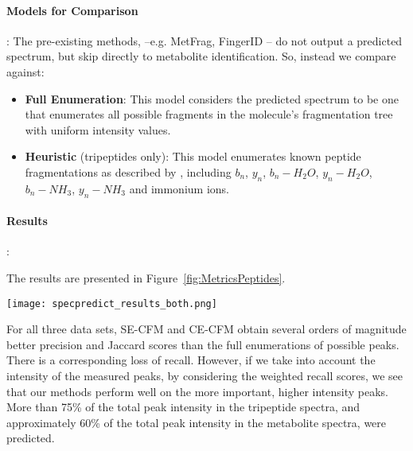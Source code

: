 \paragraph{Models for Comparison}:
The pre-existing methods, --e.g. MetFrag, FingerID -- do not output a predicted spectrum, but skip directly to metabolite identification. 
So, instead we compare against:
\begin{itemize}
\item \textbf{Full Enumeration}: This model considers the predicted spectrum to be one that enumerates all possible fragments in the molecule's fragmentation tree with uniform intensity values. 
\item \textbf{Heuristic} (tripeptides only): This model enumerates known peptide fragmentations as described by \citep{Papayannopoulos1995}, including $b_{n}$, $y_{n}$, $b_{n} - H_{2}O$, $y_{n}- H_{2}O$, $b_{n} - NH_{3}$, $y_{n}- NH_{3}$ and immonium ions.
\end{itemize}

\paragraph{Results}:

The results are presented in Figure~\ref{fig:MetricsPeptides}.
\begin{figure*}
\begin{center}
\texttt{[image: specpredict\_results\_both.png]}
\caption{Spectrum prediction results for tripeptides (left), metabolites from Metlin (middle) and metabolites from MassBank (right). The x-axes show the five metrics: Weighted Recall (WR), Weighted Precision (WP), Recall (R), Precision (P) and Jaccard (J), averaged across the three energy levels for each test molecule. Bars display mean scores $\pm$ standard error. In each plot, note that the y-axis for Jaccard (on right) is different from the others (on left).}
\label{fig:MetricsPeptides}
\end{center}
\end{figure*}
For all three data sets, SE-CFM and CE-CFM obtain several orders of magnitude better precision and Jaccard scores than the full enumerations of possible peaks.
There is a corresponding loss of recall. However, if we take into account the intensity of the measured peaks, by considering the weighted recall scores, we see that our methods perform well on the more important, higher intensity peaks. 
More than 75\% of the total peak intensity in the tripeptide spectra, and approximately 60\% of the total peak intensity in the metabolite spectra, were predicted.

